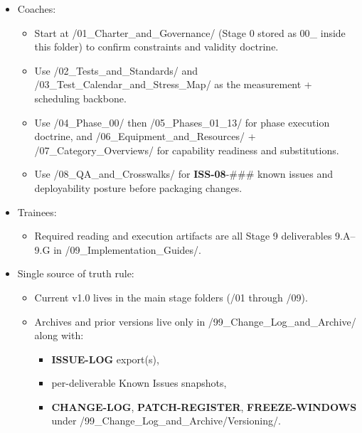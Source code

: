 \documentclass[10pt]{article}
\begin{document}
\begin{itemize}
\item Coaches:
  \begin{itemize}
  \item Start at /01\_Charter\_and\_Governance/ (Stage 0 stored as 00\_\* inside this folder) to confirm constraints and validity doctrine.
  \item Use /02\_Tests\_and\_Standards/ and /03\_Test\_Calendar\_and\_Stress\_Map/ as the measurement + scheduling backbone.
  \item Use /04\_Phase\_00/ then /05\_Phases\_01\_13/ for phase execution doctrine, and /06\_Equipment\_and\_Resources/ + /07\_Category\_Overviews/ for capability readiness and substitutions.
  \item Use /08\_QA\_and\_Crosswalks/ for \textbf{ISS-08}-\#\#\# known issues and deployability posture before packaging changes.
  \end{itemize}
\item Trainees:
  \begin{itemize}
  \item Required reading and execution artifacts are all Stage 9 deliverables 9.A–9.G in /09\_Implementation\_Guides/.
  \end{itemize}
\item Single source of truth rule:
  \begin{itemize}
  \item Current v1.0 lives in the main stage folders (/01 through /09).
  \item Archives and prior versions live only in /99\_Change\_Log\_and\_Archive/ along with:
    \begin{itemize}
    \item \textbf{ISSUE-LOG} export(s),
    \item per-deliverable Known Issues snapshots,
    \item \textbf{CHANGE-LOG}, \textbf{PATCH-REGISTER}, \textbf{FREEZE-WINDOWS} under /99\_Change\_Log\_and\_Archive/Versioning/.
    \end{itemize}
  \end{itemize}
\end{itemize}
\end{document}
